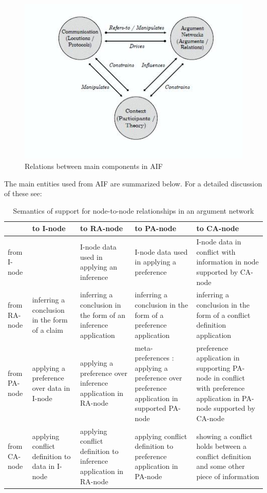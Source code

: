 \begin{figure}[tbh]
\centering
\includegraphics{aifs1.jpg}
\caption{Relations between main components in AIF}
\label{fig:aif1}
\end{figure}

The main entities used from AIF are summarized below. For a detailed discussion of these see\cite{aif}:
\begin{table}[tbh]
\centering
\begin{tabular}{|p{2.3cm}|p{2.3cm}|p{2.3cm}|p{2.3cm}|p{2.3cm}|}
\hline
&to I-node & to RA-node & to PA-node & to CA-node\\
\hline
from I-node & & I-node data used in applying an inference & I-node data used in applying a preference & I-node data in conflict with information in node supported by CA-node\\
\hline
from RA-node & inferring a conclusion in the form of a claim & inferring a conclusion in the form of an inference application & inferring a conclusion in the form of a preference application & inferring a conclusion in the form of a conflict definition application\\
\hline
from PA-node & applying a preference over data in I-node & applying a preference over inference application in RA-node & meta- preferences : applying a preference over preference application in supported PA-node & preference application in
supporting PA-node in conflict with preference application in PA-node supported by CA-node \\
\hline
from CA-node & applying conflict definition to data in I-node & applying conflict definition to inference application in RA-node & applying conflict definition to preference application in PA-node & showing a conflict holds between a conflict definition and some other piece of information \\
\hline
\end{tabular}
\label{tab:aif}
\caption{Semantics of support for node-to-node relationships in an argument network\cite{aif}}
\end{table}

